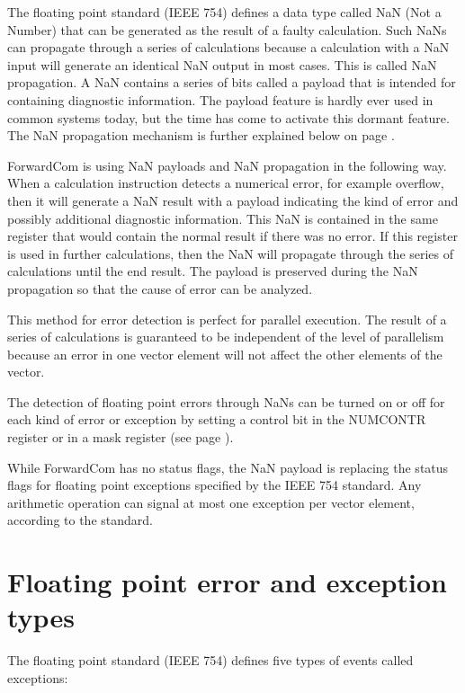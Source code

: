 \documentclass[forwardcom.tex]{subfiles}
\begin{document}
The floating point standard (IEEE 754) defines a data type called NaN (Not a Number) that can be generated as the result of a faulty calculation. Such NaNs can propagate through a series of calculations because a calculation with a NaN input will generate an identical NaN output in most cases. This is called NaN propagation. A NaN contains a series of bits called a payload that is intended for containing diagnostic information. The payload feature is hardly ever used in common systems today, but the time has come to activate this dormant feature. The NaN propagation mechanism is further explained below on page \pageref{nanPropagation}.
\vv

ForwardCom is using NaN payloads and NaN propagation in the following way. When a calculation instruction detects a numerical error, for example overflow, then it will generate a NaN result with a payload indicating the kind of error and possibly additional diagnostic information. This NaN is contained in the same register that would contain the normal result if there was no error. 
If this register is used in further calculations, then the NaN will propagate through the series of calculations until the end result. The payload is preserved during the NaN propagation so that the cause of error can be analyzed.
\vv

This method for error detection is perfect for parallel execution. The result of a series of calculations is guaranteed to be independent of the level of parallelism because an error in one vector element will not affect the other elements of the vector.
\vv

The detection of floating point errors through NaNs can be turned on or off for each kind of error or exception by setting a control bit in the NUMCONTR register or in a mask register (see page \pageref{table:maskBits}).
\vv

While ForwardCom has no status flags, the NaN payload is replacing the 
status flags for floating point exceptions specified by the IEEE 754 standard. 
Any arithmetic operation can signal at most one exception per vector element, according to the standard.
\vv


\section{Floating point error and exception types}
\label{FloatingPointExceptionTypes}

The floating point standard (IEEE 754) defines five types of events called exceptions:
\end{document}
